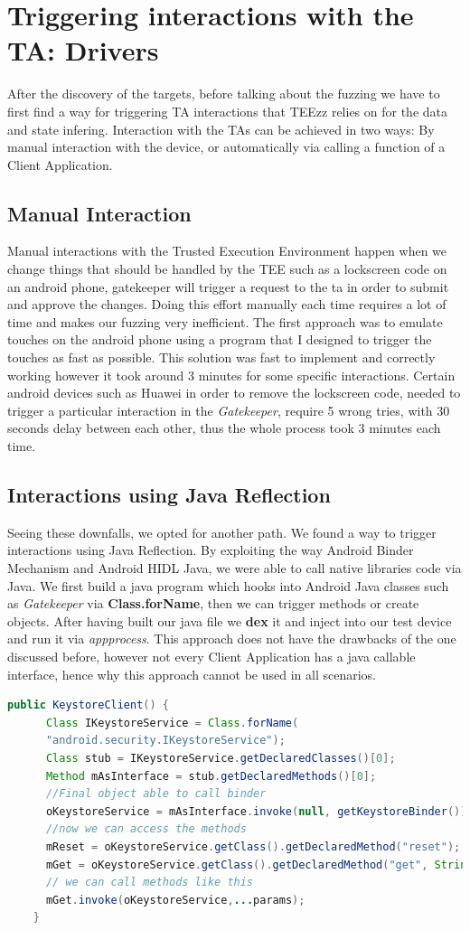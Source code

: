 \documentclass[a4paper,11pt,oneside]{report}
\newcommand{\sysname}{TEEzz\xspace}
\begin{document}
\chapter{Triggering interactions with the TA: Drivers}
After the discovery of the targets, before talking about the fuzzing we have to
first find a way for triggering TA interactions that \sysname relies on for the
data and state infering. Interaction with the TAs can be achieved in two ways:
By manual interaction with the device, or automatically via calling a function
of a Client Application.
\section{Manual Interaction}
Manual interactions with the Trusted Execution Environment happen when
we change things that should be handled by the TEE such as a lockscreen code on an android phone, gatekeeper will trigger a request
to the ta in order to submit and approve the changes. Doing this effort
manually each time requires a lot of time and makes our fuzzing very inefficient.
The first approach was to emulate touches on the android phone using a
program that I designed to trigger the touches as fast as possible.
This solution was fast to implement and correctly working however it
took around 3 minutes for some specific interactions.
Certain android devices such as Huawei in order to
remove the lockscreen code, needed to trigger a particular interaction in the
\emph{Gatekeeper}, require 5 wrong tries, with 30 seconds delay between
each other, thus the whole process took 3 minutes each time.
\section{Interactions using Java Reflection}
Seeing these downfalls, we opted
for another path. We found a way to trigger interactions using Java
Reflection. By exploiting the way Android Binder Mechanism and Android HIDL
Java, we were able to call native libraries code via Java. We first build a
java program which hooks into Android Java classes such as \emph{Gatekeeper}
via \textbf{Class.forName}, then we can trigger methods or create objects.
After having built our java file we \textbf{dex} it and inject into our test device and
run it via \emph{app\textunderscore process}. This approach does not have the
drawbacks of
the one discussed before, however not every Client Application has a java
callable interface, hence why this approach cannot be used in all scenarios.
\begin{lstlisting}[language=Java, caption="Example driver for Keystore"]
public KeystoreClient() {
      Class IKeystoreService = Class.forName(
      "android.security.IKeystoreService");
      Class stub = IKeystoreService.getDeclaredClasses()[0];
      Method mAsInterface = stub.getDeclaredMethods()[0];
      //Final object able to call binder
      oKeystoreService = mAsInterface.invoke(null, getKeystoreBinder());
      //now we can access the methods
      mReset = oKeystoreService.getClass().getDeclaredMethod("reset");
      mGet = oKeystoreService.getClass().getDeclaredMethod("get", String.class, int.class);
      // we can call methods like this
      mGet.invoke(oKeystoreService,...params);
    }
\end{lstlisting}
\end{document}
